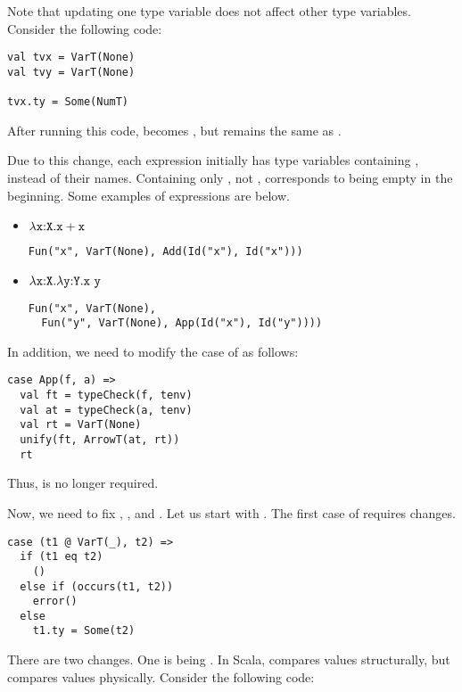 Note that updating one type variable does not affect other type variables.
Consider the following code:

\begin{verbatim}
val tvx = VarT(None)
val tvy = VarT(None)

tvx.ty = Some(NumT)
\end{verbatim}

After running this code,  becomes , but
 remains the same as .

Due to this change, each expression initially has type variables containing
, instead of their names. Containing only , not
, corresponds to  being empty in the beginning. Some
examples of expressions are below.

\begin{itemize}
\item $\lambda\texttt{x}{:}\texttt{X}.\texttt{x}+\texttt{x}$
\begin{verbatim}
Fun("x", VarT(None), Add(Id("x"), Id("x")))
\end{verbatim}
\item $\lambda\texttt{x}{:}\texttt{X}.\lambda\texttt{y}{:}\texttt{Y}.\texttt{x}\ \texttt{y}$
\begin{verbatim}
Fun("x", VarT(None),
  Fun("y", VarT(None), App(Id("x"), Id("y"))))
\end{verbatim}
\end{itemize}

In addition, we need to modify the  case of  as
follows:

\begin{verbatim}
case App(f, a) =>
  val ft = typeCheck(f, tenv)
  val at = typeCheck(a, tenv)
  val rt = VarT(None)
  unify(ft, ArrowT(at, rt))
  rt
\end{verbatim}

Thus,  is no longer required.

Now, we need to fix , , and . Let us
start with . The first case of  requires changes.

\begin{verbatim}
case (t1 @ VarT(_), t2) =>
  if (t1 eq t2)
    ()
  else if (occurs(t1, t2))
    error()
  else
    t1.ty = Some(t2)
\end{verbatim}

There are two changes. One is  being . In Scala,
\code{==} compares values structurally, but  compares values
physically. Consider the following code:

